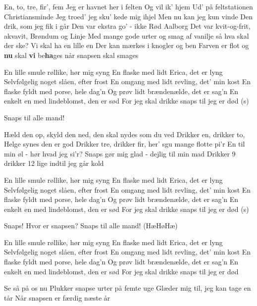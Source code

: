 \documentclass[a4paper,11pt]{article}
\begin{document}
\begin{song}
  En, to, tre, fir’, fem
Jeg er havnet her i felten
Og vil ik’ hjem
Ud’ på feltstationen Christiansminde
Jeg troed’ jeg sku’ kede mig ihjel
Men nu kan jeg kun vinde
   Den drik, som jeg fik i går
Den var ekstra go’ - ikke Rød Aalborg
Det var kvit-og-frit, akvavit, Brøndum og Linje
Med mange gode urter og smag af 
vanilje
 så hva skal der ske? Vi skal ha en lille en
 Der kan mærkes i knogler og ben
Farven er flot og \textbf{nu} skal \textbf{vi} be\textbf{ha}ges
når snapsen skal smages

  En lille smule røllike, hør mig syng
En flaske med lidt Erica, det er lyng
Selvfølgelig noget slåen, efter frost
En omgang med lidt revling, det’ min kost
En flaske fyldt med porse, hele dag’n
Og prøv lidt brændenælde, det er sag’n
En enkelt en med lindeblomst, den er sød
For jeg skal drikke snaps til jeg er død (s)

  Snaps til alle mand!

  Hæld den op, skyld den ned, den skal nydes som du ved
 Drikker en, drikker to, Helge synes den er 
god
Drikker tre, drikker fir, her’ sgu mange flotte pi’r
En til min øl - hør hvad jeg si’r?
Snaps gør mig glad - dejlig til min mad
Drikker 9 drikker 12 lige indtil jeg går kold

  En lille smule røllike, hør mig syng
En flaske med lidt Erica, det er lyng
Selvfølgelig noget slåen, efter frost
En omgang med lidt revling, det’ min kost
En flaske fyldt med porse, hele dag’n
Og prøv lidt brændenælde, det er sag’n
En enkelt en med lindeblomst, den er sød
For jeg skal drikke snaps til jeg er død (s)

  Snaps!
Hvor er snapsen?
Snaps til alle mand!
(HæHøHæ)

  En lille smule røllike, hør mig syng
En flaske med lidt Erica, det er lyng
Selvfølgelig noget slåen, efter frost
En omgang med lidt revling, det’ min kost
En flaske fyldt med porse, hele dag’n
Og prøv lidt brændenælde, det er sag’n
En enkelt en med lindeblomst, den er sød
For jeg skal drikke snaps til jeg er død

  Se så på os nu
Plukker snapse urter på femte uge
Glæder mig til, jeg kan tage en tår
 Når snapsen er færdig næste år

\end{song}
\end{document}
